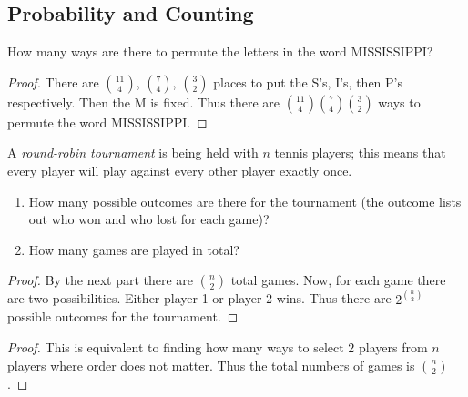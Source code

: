 \subsection{Probability and Counting}

\begin{tcolorbox}[title=Problem 1, breakable]
    How many ways are there to permute the letters 
        in the word MISSISSIPPI?
\end{tcolorbox}

\begin{proof}
    There are $\binom{11}{4}$, $\binom{7}{4}$, $\binom{3}{2}$ places to put the S's,
    I's, then P's respectively. Then the M is fixed.
    Thus there are $\binom{11}{4}\binom{7}{4}\binom{3}{2}$ ways 
        to permute the word MISSISSIPPI.
\end{proof}

\begin{tcolorbox}[title=Problem 4, breakable]
    A \emph{round-robin tournament} is being held with $n$ tennis players;
    this means that every player will play against every other player exactly once.
    \begin{enumerate}
        \item How many possible outcomes are there for the tournament
              (the outcome lists out who won and who lost for each game)?
        \item How many games are played in total?
    \end{enumerate}
\end{tcolorbox}

\begin{proof}
    By the next part there are $\binom{n}{2}$ total games.  
    Now, for each game there are two possibilities.
    Either player 1 or player 2 wins.
    Thus there are $2^{\binom{n}{2}}$ possible outcomes for the tournament.
\end{proof}

\begin{proof}
    This is equivalent to finding how many ways to select $2$ players from $n$ players
        where order does not matter.
    Thus the total numbers of games is $\binom{n}{2}$.
\end{proof}

